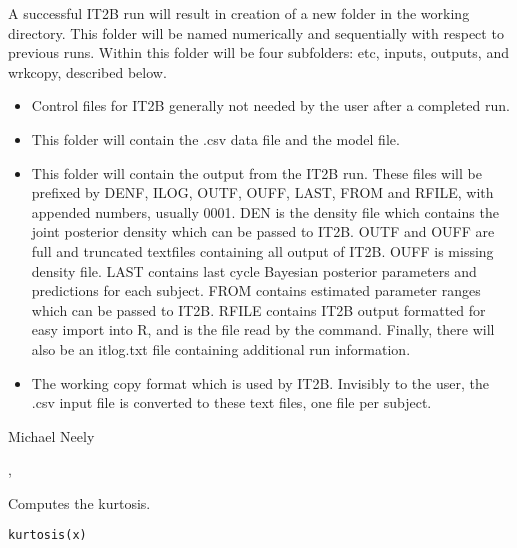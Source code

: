\documentclass[a4paper]{book}
\begin{document}
%
\begin{Value}
A successful IT2B run will result in creation of a new folder in the working
directory. This folder will be named numerically and sequentially with respect to previous runs.   
Within this folder will be four subfolders: etc, inputs, outputs, and
wrkcopy, described below.
\begin{itemize}

\item{}    Control files for IT2B generally not needed by the user after a completed run.
\item{}    This folder will contain the .csv data file and the model file.
\item{}    This folder will contain the output from the IT2B run.  These files will be
prefixed by DENF, ILOG, OUTF, OUFF, LAST, FROM and RFILE, with appended numbers, usually 0001.
DEN is the density file which contains the joint posterior density which can be passed to IT2B.
OUTF and OUFF are full and truncated textfiles containing all output of IT2B.  OUFF is missing
density file.  LAST contains last cycle Bayesian posterior parameters and predictions for
each subject.  FROM contains estimated parameter ranges which can be passed to IT2B.
RFILE contains IT2B output formatted for easy import into R, and is the file read by
the  command.  Finally, there will also be an itlog.txt file
containing additional run information.
\item{}     The working copy format which is used by IT2B.  Invisibly to the user,
the .csv input file is converted to these text files, one file per subject.  

\end{itemize}

\end{Value}
%
\begin{Author}\relax
Michael Neely
\end{Author}
%
\begin{SeeAlso}\relax
{}, 
\end{SeeAlso}
%
\begin{Description}\relax
Computes the kurtosis.
\end{Description}
%
\begin{Usage}
\begin{verbatim}
kurtosis(x)
\end{verbatim}
\end{Usage}
\end{document}
